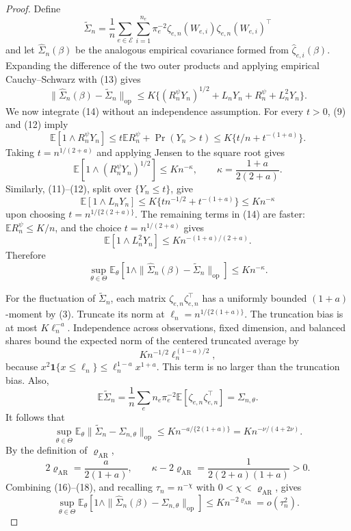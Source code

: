 \documentclass{article}
\begin{document}
\begin{proof}
Define
\[
 \widetilde\Sigma_n=\frac1n\sum_{e\in\mathcal E}\sum_{i=1}^{n_e}\pi_e^{-2}
 \zeta_{e,n}(W_{e,i})\zeta_{e,n}(W_{e,i})^\top
\]
and let \(\widehat\Sigma_n(\beta)\) be the analogous empirical covariance formed from \(\widehat\zeta_{e,i}(\beta)\).  Expanding the difference of the two outer products and applying empirical Cauchy--Schwarz with (13) gives
\[
 \|\widehat\Sigma_n(\beta)-\widetilde\Sigma_n\|_{\mathrm{op}}
 \leq K\{(R_n^\psi Y_n)^{1/2}+L_nY_n
              +R_n^\psi+L_n^2Y_n\}. \tag{14}
\]
We now integrate (14) without an independence assumption.  For every \(t>0\), (9) and (12) imply
\[
 \mathbb E[1\wedge R_n^\psi Y_n]
 \leq t\mathbb ER_n^\psi+\Pr(Y_n>t)
 \leq K\{t/n+t^{-(1+a)}\}.
\]
Taking \(t=n^{1/(2+a)}\) and applying Jensen to the square root gives
\[
 \mathbb E[1\wedge(R_n^\psi Y_n)^{1/2}]
 \leq K n^{-\kappa},
 \qquad
 \kappa=\frac{1+a}{2(2+a)}. \tag{15}
\]
Similarly, (11)--(12), split over \(\{Y_n\leq t\}\), give
\[
 \mathbb E[1\wedge L_nY_n]
 \leq K\{tn^{-1/2}+t^{-(1+a)}\}
 \leq K n^{-\kappa}
\]
upon choosing \(t=n^{1/\{2(2+a)\}}\).  The remaining terms in (14) are faster: \(\mathbb ER_n^\psi\leq K/n\), and the choice \(t=n^{1/(2+a)}\) gives
\[
 \mathbb E[1\wedge L_n^2Y_n]
 \leq K n^{-(1+a)/(2+a)}.
\]
Therefore
\[
 \sup_{\theta\in\Theta}\mathbb E_\theta\!\left[
 1\wedge\|\widehat\Sigma_n(\beta)-\widetilde\Sigma_n\|_{\mathrm{op}}
 \right]
 \leq K n^{-\kappa}. \tag{16}
\]

For the fluctuation of \(\widetilde\Sigma_n\), each matrix
\(\zeta_{e,n}\zeta_{e,n}^\top\) has a uniformly bounded \((1+a)\)-moment by (3).  Truncate its norm at
\(\ell_n=n^{1/\{2(1+a)\}}\).  The truncation bias is at most \(K\ell_n^{-a}\).  Independence across observations, fixed dimension, and balanced shares bound the expected norm of the centered truncated average by
\[
 K n^{-1/2}\ell_n^{(1-a)/2},
\]
because \(x^2\mathbf 1\{x\leq\ell_n\}\leq\ell_n^{1-a}x^{1+a}\).  This term is no larger than the truncation bias.  Also,
\[
 \mathbb E\widetilde\Sigma_n
 =\frac1n\sum_e n_e\pi_e^{-2}
   \mathbb E[\zeta_{e,n}\zeta_{e,n}^\top]
 =\Sigma_{n,\theta}.
\]
It follows that
\[
 \sup_{\theta\in\Theta}\mathbb E_\theta
 \|\widetilde\Sigma_n-\Sigma_{n,\theta}\|_{\mathrm{op}}
 \leq K n^{-a/\{2(1+a)\}}
 =K n^{-\nu/(4+2\nu)}. \tag{17}
\]
By the definition of \(\varrho_{\mathrm{AR}}\),
\[
 2\varrho_{\mathrm{AR}}=\frac{a}{2(1+a)},
 \qquad
 \kappa-2\varrho_{\mathrm{AR}}
 =\frac{1}{2(2+a)(1+a)}>0. \tag{18}
\]
Combining (16)--(18), and recalling \(\tau_n=n^{-\chi}\) with
\(0<\chi<\varrho_{\mathrm{AR}}\), gives
\[
 \sup_{\theta\in\Theta}\mathbb E_\theta\!\left[
 1\wedge\|\widehat\Sigma_n(\beta)-\Sigma_{n,\theta}\|_{\mathrm{op}}
 \right]
 \leq K n^{-2\varrho_{\mathrm{AR}}}=o(\tau_n^2). \tag{19}
\]


\end{proof}
\end{document}
